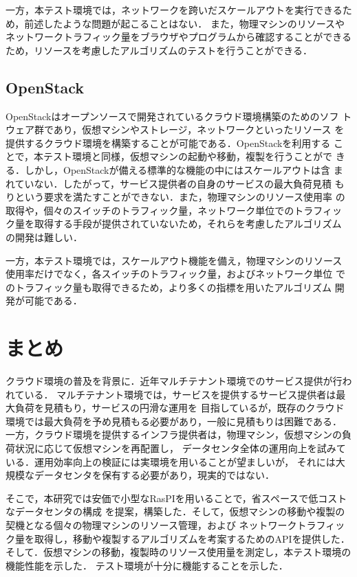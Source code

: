 \documentclass[submit,techrep]{ipsj}
\begin{document}
一方，本テスト環境では，ネットワークを跨いだスケールアウトを実行できるため，前述したような問題が起こることはない．
また，物理マシンのリソースやネットワークトラフィック量をブラウザやプログラムから確認することができるため，リソースを考慮したアルゴリズムのテストを行うことができる．

\subsection{OpenStack}
OpenStack\cite{openstack}はオープンソースで開発されているクラウド環境構築のためのソフ
トウェア群であり，仮想マシンやストレージ，ネットワークといったリソース
を提供するクラウド環境を構築することが可能である．OpenStackを利用する
ことで，本テスト環境と同様，仮想マシンの起動や移動，複製を行うことがで
きる．しかし，OpenStackが備える標準的な機能の中にはスケールアウトは含
まれていない．したがって，サービス提供者の自身のサービスの最大負荷見積
もりという要求を満たすことができない．また，物理マシンのリソース使用率
の取得や，個々のスイッチのトラフィック量，ネットワーク単位でのトラフィッ
ク量を取得する手段が提供されていないため，それらを考慮したアルゴリズム
の開発は難しい．

一方，本テスト環境では，スケールアウト機能を備え，物理マシンのリソース
使用率だけでなく，各スイッチのトラフィック量，およびネットワーク単位
でのトラフィック量も取得できるため，より多くの指標を用いたアルゴリズム
開発が可能である．

\section{まとめ}
クラウド環境の普及を背景に．近年マルチテナント環境でのサービス提供が行われている．
マルチテナント環境では，サービスを提供するサービス提供者は最大負荷を見積もり，サービスの円滑な運用を
目指しているが，既存のクラウド環境では最大負荷を予め見積もる必要があり，一般に見積もりは困難である．
一方，クラウド環境を提供するインフラ提供者は，物理マシン，仮想マシンの負荷状況に応じて仮想マシンを再配置し，
データセンタ全体の運用向上を試みている．運用効率向上の検証には実環境を用いることが望ましいが，
それには大規模なデータセンタを保有する必要があり，現実的ではない．

そこで，本研究では安価で小型なRasPIを用いることで，省スペースで低コストなデータセンタの構成
を提案，構築した．そして，仮想マシンの移動や複製の契機となる個々の物理マシンのリソース管理，および
ネットワークトラフィック量を取得し，移動や複製するアルゴリズムを考案するためのAPIを提供した．
そして．仮想マシンの移動，複製時のリソース使用量を測定し，本テスト環境の機能性能を示した．
テスト環境が十分に機能することを示した．
\end{document}
